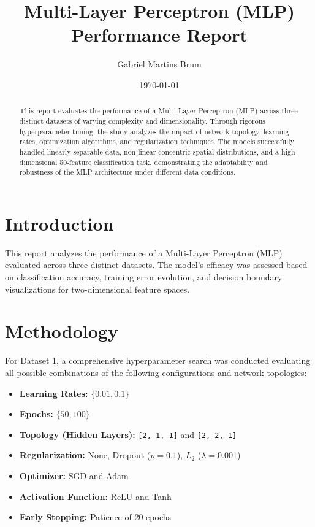 \documentclass{article}
\title{Multi-Layer Perceptron (MLP) Performance Report}
\author{Gabriel Martins Brum}
\date{\today}
\begin{document}
\maketitle

\begin{abstract}
This report evaluates the performance of a Multi-Layer Perceptron (MLP) across three distinct datasets of varying complexity and dimensionality. Through rigorous hyperparameter tuning, the study analyzes the impact of network topology, learning rates, optimization algorithms, and regularization techniques. The models successfully handled linearly separable data, non-linear concentric spatial distributions, and a high-dimensional 50-feature classification task, demonstrating the adaptability and robustness of the MLP architecture under different data conditions.
\end{abstract}

\section{Introduction}
This report analyzes the performance of a Multi-Layer Perceptron (MLP) evaluated across three distinct datasets. The model's efficacy was assessed based on classification accuracy, training error evolution, and decision boundary visualizations for two-dimensional feature spaces.

\section{Methodology}

For Dataset 1, a comprehensive hyperparameter search was conducted evaluating all possible combinations of the following configurations and network topologies:
\begin{itemize}
    \item \textbf{Learning Rates:} $\{0.01, 0.1\}$
    \item \textbf{Epochs:} $\{50, 100\}$
    \item \textbf{Topology (Hidden Layers):} \texttt{[2, 1, 1]} and \texttt{[2, 2, 1]}
    \item \textbf{Regularization:} None, Dropout ($p=0.1$), $L_2$ ($\lambda=0.001$) 
    \item \textbf{Optimizer:} SGD and Adam
    \item \textbf{Activation Function:} ReLU and Tanh
    \item \textbf{Early Stopping:} Patience of 20 epochs
\end{itemize}
\end{document}

